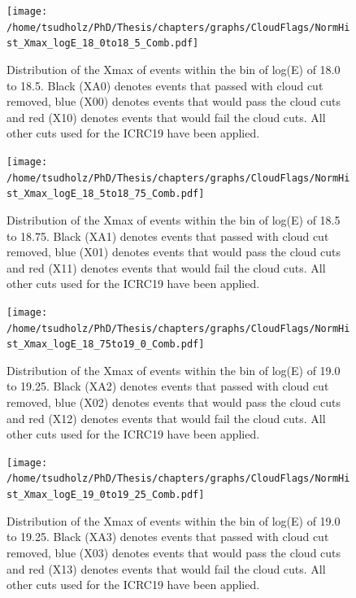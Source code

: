 %


\begin{figure}
\centering
\texttt{[image: /home/tsudholz/PhD/Thesis/chapters/graphs/CloudFlags/NormHist\_Xmax\_logE\_18\_0to18\_5\_Comb.pdf]}
\caption{Distribution of the Xmax of events within the bin of log(E) of 18.0 to 18.5. Black (XA0) denotes events that passed with cloud cut removed, blue (X00) denotes events that would pass the cloud cuts and red (X10) denotes events that would fail the cloud cuts. All other cuts used for the ICRC19 have been applied.}
\end{figure}

\begin{figure}
\centering
\texttt{[image: /home/tsudholz/PhD/Thesis/chapters/graphs/CloudFlags/NormHist\_Xmax\_logE\_18\_5to18\_75\_Comb.pdf]}
\caption{Distribution of the Xmax of events within the bin of log(E) of 18.5 to 18.75. Black (XA1) denotes events that passed with cloud cut removed, blue (X01) denotes events that would pass the cloud cuts and red (X11) denotes events that would fail the cloud cuts. All other cuts used for the ICRC19 have been applied.}
\end{figure}

\begin{figure}
\centering
\texttt{[image: /home/tsudholz/PhD/Thesis/chapters/graphs/CloudFlags/NormHist\_Xmax\_logE\_18\_75to19\_0\_Comb.pdf]}
\caption{Distribution of the Xmax of events within the bin of log(E) of 19.0 to 19.25. Black (XA2) denotes events that passed with cloud cut removed, blue (X02) denotes events that would pass the cloud cuts and red (X12) denotes events that would fail the cloud cuts. All other cuts used for the ICRC19 have been applied.}
\end{figure}

\begin{figure}
\centering
\texttt{[image: /home/tsudholz/PhD/Thesis/chapters/graphs/CloudFlags/NormHist\_Xmax\_logE\_19\_0to19\_25\_Comb.pdf]}
\caption{Distribution of the Xmax of events within the bin of log(E) of 19.0 to 19.25. Black (XA3) denotes events that passed with cloud cut removed, blue (X03) denotes events that would pass the cloud cuts and red (X13) denotes events that would fail the cloud cuts. All other cuts used for the ICRC19 have been applied.}
\end{figure}

